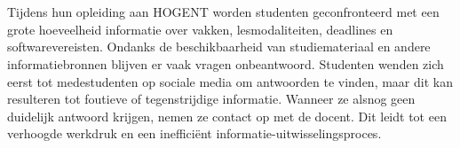 
%
%
%
%
%

%



\chapter*{}

Tijdens hun opleiding aan HOGENT worden studenten geconfronteerd met een grote hoeveelheid informatie over vakken, lesmodaliteiten, deadlines en softwarevereisten. Ondanks de beschikbaarheid van studiemateriaal en andere informatiebronnen blijven er vaak vragen onbeantwoord. Studenten wenden zich eerst tot medestudenten op sociale media om antwoorden te vinden, maar dit kan resulteren tot foutieve of tegenstrijdige informatie. Wanneer ze alsnog geen duidelijk antwoord krijgen, nemen ze contact op met de docent. Dit leidt tot een verhoogde werkdruk en een inefficiënt informatie-uitwisselingsproces.

